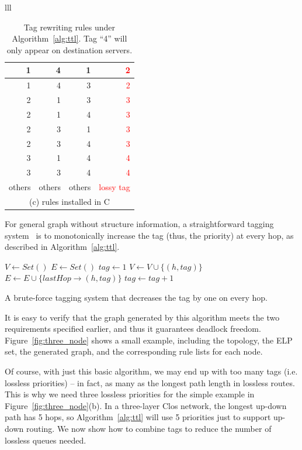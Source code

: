 \begin{table}[t]
{\begin{tabular}{lll}
\begin{tabular}{|r|r|r|r|}
			\hline
			\hline
			1 & 4 & 1 & \textcolor{red}{2} \\
			\hline
			1 & 4 & 3 & \textcolor{red}{2} \\
			\hline
			2 & 1 & 3 & \textcolor{red}{3} \\
			\hline
			2 & 1 & 4 & \textcolor{red}{3} \\
			\hline
			2 & 3 & 1 & \textcolor{red}{3} \\
			\hline
			2 & 3 & 4 & \textcolor{red}{3} \\
			\hline
			3 & 1 & 4 & \textcolor{red}{4} \\
			\hline
			3 & 3 & 4 & \textcolor{red}{4} \\
			\hline
			others & others & others & \textcolor{red}{lossy tag} \\
			\hline
			\multicolumn{4}{c}{(c) rules installed in C} \\
		\end{tabular}
	\end{tabular}
}
	\caption{Tag rewriting rules under Algorithm~\ref{alg:ttl}. Tag ``4'' will only appear on destination servers.}
	\vspace{-2em}
	\label{table:tagging_table}
\end{table}

For general graph without structure information, a straightforward tagging
system~\cite{karol2003prevention} is to monotonically increase the tag (thus,
the priority) at every hop, as described in Algorithm~\ref{alg:ttl}.

\begin{algorithm}[t]
	\small
	$V \gets Set()$\;
	$E \gets Set()$\;
	 {
		$tag \gets 1$\;
		 {
			$V \gets V \cup \{(h, tag)\}$\;
			$E \gets E \cup \{lastHop\rightarrow(h, tag)\}$\;
			$tag \gets tag+1$\;
		}
	}
	\;
    \caption{A brute-force tagging system that decreases the tag by one on every hop.}
	\label{alg:ttl}
\end{algorithm}

It is easy to verify that the graph generated by this algorithm meets the two
requirements specified earlier, and thus it guarantees deadlock freedom.
Figure~\ref{fig:three_node} shows a small example, including the topology, the
ELP set, the generated graph, and the corresponding rule
lists for each node.

Of course, with just this basic algorithm, we may end up with too many tags
(i.e. lossless priorities) -- in fact, as many as the longest path length in
lossless routes. This is why we need three lossless priorities for
the simple example in Figure~\ref{fig:three_node}(b). In a three-layer Clos
network, the longest up-down path has 5 hops, so Algorithm~\ref{alg:ttl} will use 5
priorities just to support up-down routing. We now show how to combine tags to
reduce the number of lossless queues needed.

